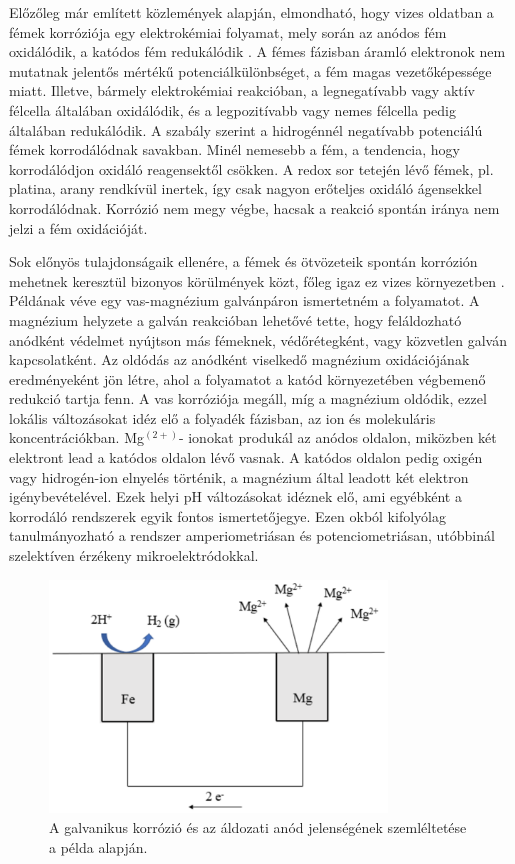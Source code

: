 Előzőleg már említett közlemények alapján, elmondható, hogy vizes oldatban a fémek korróziója egy elektrokémiai folyamat, mely során az anódos fém oxidálódik, a katódos fém redukálódik \cite{isaacs1981scanning}. A fémes fázisban áramló elektronok nem mutatnak jelentős mértékű potenciálkülönbséget, a fém magas vezetőképessége miatt. Illetve, bármely elektrokémiai reakcióban, a legnegatívabb vagy aktív félcella általában oxidálódik, és a legpozitívabb vagy nemes félcella pedig általában redukálódik. A szabály szerint a hidrogénnél negatívabb potenciálú fémek korrodálódnak savakban. Minél nemesebb a fém, a tendencia, hogy korrodálódjon oxidáló reagensektől csökken. A redox sor tetején lévő fémek, pl. platina, arany rendkívül inertek, így csak nagyon erőteljes oxidáló ágensekkel korrodálódnak. Korrózió nem megy végbe, hacsak a reakció spontán iránya nem jelzi a fém oxidációját.

Sok előnyös tulajdonságaik ellenére, a fémek és ötvözeteik spontán korrózión mehetnek keresztül bizonyos körülmények közt, főleg igaz ez vizes környezetben \cite{izquierdo2013potentiometric}. Példának véve egy vas-magnézium galvánpáron ismertetném a folyamatot. A magnézium helyzete a galván reakcióban lehetővé tette, hogy feláldozható anódként védelmet nyújtson más fémeknek, védőrétegként, vagy közvetlen galván kapcsolatként. Az oldódás az anódként viselkedő magnézium oxidációjának eredményeként jön létre, ahol a folyamatot a katód környezetében végbemenő redukció tartja fenn. A vas korróziója megáll, míg a magnézium oldódik, ezzel lokális változásokat idéz elő a folyadék fázisban, az ion és molekuláris koncentrációkban. Mg$^(2+)$- ionokat produkál az anódos oldalon, miközben két elektront lead a katódos oldalon lévő vasnak. A katódos oldalon pedig oxigén vagy hidrogén-ion elnyelés történik, a magnézium által leadott két elektron igénybevételével. Ezek helyi pH változásokat idéznek elő, ami egyébként a korrodáló rendszerek egyik fontos ismertetőjegye.  Ezen okból kifolyólag tanulmányozható a rendszer amperiometriásan és potenciometriásan, utóbbinál szelektíven érzékeny mikroelektródokkal.

\begin{figure}
\centering
\includegraphics[width=0.8\textwidth]{img/corrosion.eps}
\caption{A galvanikus korrózió és az áldozati anód jelenségének szemléltetése a példa alapján.}
\label{fig:corrosion}
\end{figure}

